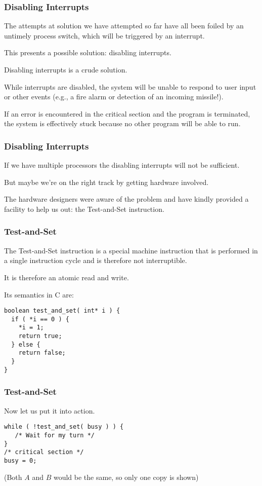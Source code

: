 \begin{frame}
\frametitle{Disabling Interrupts}

The attempts at solution we have attempted so far have all been foiled by an untimely process switch, which will be triggered by an interrupt. 

This presents a possible solution: disabling interrupts. 

Disabling interrupts is a crude solution. 

While interrupts are disabled, the system will be unable to respond to user input or other events (e.g., a fire alarm or detection of an incoming missile!). 

If an error is encountered in the critical section and the program is terminated, the system is effectively stuck because no other program will be able to run.


\end{frame}

\begin{frame}
\frametitle{Disabling Interrupts}

If we have multiple processors the disabling interrupts will not be sufficient. 

But maybe we're on the right track by getting hardware involved.


The hardware designers were aware of the problem and have kindly provided a facility to help us out: the \alert{Test-and-Set} instruction. 


\end{frame}

\begin{frame}[fragile]
\frametitle{Test-and-Set}

The Test-and-Set instruction is a special machine instruction that is performed in a single instruction cycle and is therefore not interruptible. 

It is therefore an atomic read and write. 

Its semantics in C are:

\begin{verbatim}
boolean test_and_set( int* i ) {
  if ( *i == 0 ) {
    *i = 1;
    return true;
  } else {
    return false;
  }
}
\end{verbatim}

\end{frame}

\begin{frame}[fragile]
\frametitle{Test-and-Set}

Now let us put it into action.

\begin{verbatim}
while ( !test_and_set( busy ) ) {
   /* Wait for my turn */
}
/* critical section */
busy = 0;
\end{verbatim}


(Both $A$ and $B$ would be the same, so only one copy is shown)


\end{frame}


